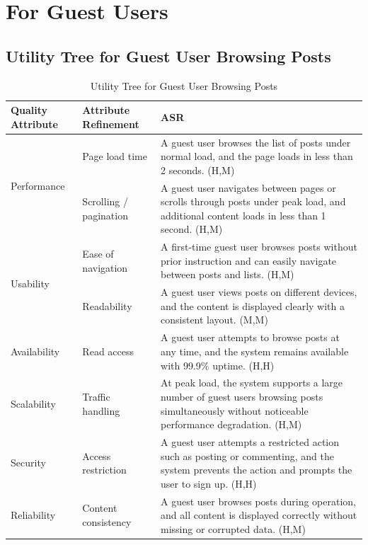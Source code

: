 \documentclass{article}
\begin{document}
\section{For Guest Users}

\subsection{Utility Tree for Guest User Browsing Posts}

\begin{table}[H]
\centering
\caption{Utility Tree for Guest User Browsing Posts}
\begin{tabular}{|p{3cm}|p{4cm}|p{7cm}|}
\hline
\textbf{Quality Attribute} & \textbf{Attribute Refinement} & \textbf{ASR} \\
\hline

\multirow{2}{*}{Performance}
& Page load time
& A guest user browses the list of posts under normal load, and the page loads in less than 2 seconds. (H,M) \\
\cline{2-3}
& Scrolling / pagination
& A guest user navigates between pages or scrolls through posts under peak load, and additional content loads in less than 1 second. (H,M) \\
\hline

\multirow{2}{*}{Usability}
& Ease of navigation
& A first-time guest user browses posts without prior instruction and can easily navigate between posts and lists. (H,M) \\
\cline{2-3}
& Readability
& A guest user views posts on different devices, and the content is displayed clearly with a consistent layout. (M,M) \\
\hline

Availability
& Read access
& A guest user attempts to browse posts at any time, and the system remains available with 99.9\% uptime. (H,H) \\
\hline

Scalability
& Traffic handling
& At peak load, the system supports a large number of guest users browsing posts simultaneously without noticeable performance degradation. (H,M) \\
\hline

Security
& Access restriction
& A guest user attempts a restricted action such as posting or commenting, and the system prevents the action and prompts the user to sign up. (H,H) \\
\hline

Reliability
& Content consistency
& A guest user browses posts during operation, and all content is displayed correctly without missing or corrupted data. (H,M) \\
\hline

\end{tabular}
\end{table}
\end{document}
